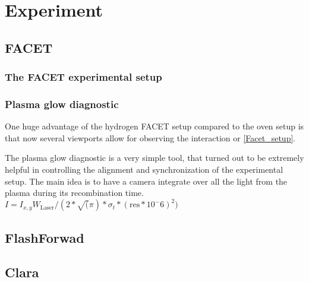 \chapter{Experiment}
\section{FACET}
\subsection{The FACET experimental setup}
\subsection{Plasma glow diagnostic}
One huge advantage of the hydrogen FACET setup compared to the oven setup is that now several viewports allow for observing the interaction or \ref{Facet_setup}.

The plasma glow diagnostic is a very simple tool, that turned out to be extremely helpful in controlling the 
alignment and synchronization of the experimental setup. The main idea is to have a camera integrate over all the light from the plasma during its recombination time. 
$I=I_{x,y}W_\mathrm{Laser}/(2*\sqrt(\pi)*\sigma_t*(\mathrm{res}*10^-6)^2)$
\section{FlashForwad}
\section{Clara}

